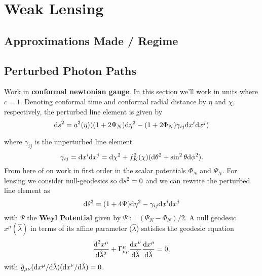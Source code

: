 \documentclass[11pt]{article} %
\DeclareRobustCommand{\d}{\ifmmode\text{d}\else d\fi}
\begin{document}
\section{Weak Lensing}
\subsection{Approximations Made / Regime}
\subsection{Perturbed Photon Paths}
Work in \textbf{conformal newtonian gauge}. In this section we'll work in units where $c=1$. Denoting conformal time and conformal radial distance by $\eta$ and $\chi$, respectively, the perturbed line element is given by
\begin{equation}
    \d s^2 = a^2(\eta)((1 + 2\Psi_N) \d \eta^2 - (1 + 2\Phi_N) \gamma_{ij}\d x^i \d x^j) 
\end{equation}

where $\gamma_{ij}$ is the unperturbed line element
\begin{equation}
    \gamma_{ij} = \d x^i \d x^j = \d \chi^2 + f^2_K(\chi)(\d \theta^2 + \sin ^2 \theta \d \phi ^2).
\end{equation}
From here of on work in first order in the scalar potentials $\Phi_N$ and $\Psi_N$. For lensing we consider null-geodesics so $\d s^2 = 0$ and we can rewrite the perturbed line element as
\begin{equation}
    \d \hat s^2 = (1 + 4\Psi)\d\eta^2 - \gamma_{ij} \d x^i \d x^j
\end{equation}
with $\Psi$ the \textbf{Weyl Potential} given by $\Psi := (\Psi_N - \Phi_N)/2$. A null geodesic $x^\mu(\hat\lambda)$ in terms of its affine parameter ($\hat \lambda$) satisfies the geodesic equation
\begin{equation}
    \frac{\d^2 x^\mu}{\d \hat\lambda^2} + \Gamma^\mu_{\nu\rho} \frac{\d x^\nu}{\d \hat\lambda}\frac{\d x^\rho}{\d\hat\lambda} = 0,
\end{equation}
with $\hat g_{\mu\nu}(\d x^\mu/\d \hat\lambda)(\d x^\nu / \d \hat \lambda) = 0$. 
\end{document}
